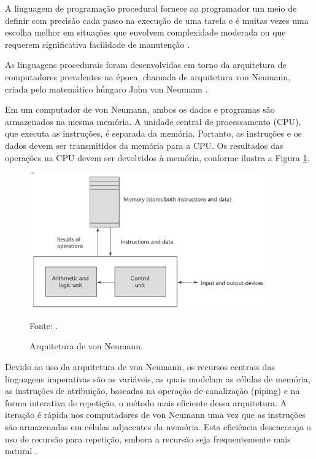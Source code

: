 A linguagem de programação procedural fornece ao programador  um meio de definir com precisão cada passo na execução de uma tarefa e é muitas vezes uma escolha melhor em situações que envolvem complexidade moderada ou que requerem significativa facilidade de manutenção \cite[pág.~22]{paquet2010}.

As linguagens procedurais foram desenvolvidas em torno da arquitetura de computadores prevalentes na época, chamada de  arquitetura von Neumann, criada pelo matemático húngaro John von Neumann \cite[pág.~18]{sebesta2012}.

Em um computador de von Neumann, ambos os dados e programas são armazenados na mesma memória. A unidade central de processamento (CPU), que executa as instruções, é separada da memória. Portanto, as instruções e os dados devem ser transmitidos da memória para a CPU. Os resultados das operações na CPU devem ser devolvidos à memória, conforme ilustra a Figura \ref{arquiteturaVon}.

\begin{figure}[H]
\centering
\includegraphics[width=0.9\textwidth]{figuras/arquiteturaVon}
\caption{Arquitetura de von Neumann.}{Fonte: .}
\label{arquiteturaVon}
\end{figure}

Devido ao uso da arquitetura de von Neumann, os recursos centrais das linguagens imperativas são as variáveis, as quais modelam as células de memória, as instruções de atribuição, baseadas na operação de canalização (piping) e na forma interativa de repetição, o método mais eficiente dessa arquitetura. A iteração é rápida nos computadores de von Neumann uma vez que as instruções são armazenadas em células adjacentes da memória. Esta eficiência desencoraja o uso de recursão para repetição, embora a recursão seja frequentemente mais natural \cite[pág.~18]{sebesta2012}.


